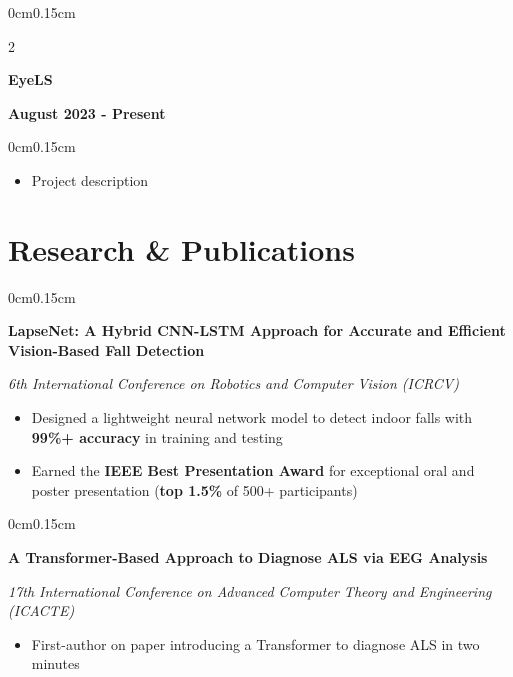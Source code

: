 \documentclass[10pt, letterpaper]{article}
\newenvironment{highlights}{
    \begin{itemize}[topsep=0pt, parsep=0pt, partopsep=0pt, itemsep=0pt, leftmargin=0.6cm]
}{
    \end{itemize}
}
\newenvironment{onecolentry}{
    \begin{adjustwidth}{0cm}{0.15cm}
}{
    \end{adjustwidth}
}
\newenvironment{twocolentry}[2][]{
    \onecolentry
    \def\secondColumn{#2}
    \setcolumnwidth{\fill, 4cm}
    \begin{paracol}{2}
}{
    \switchcolumn \raggedleft \secondColumn
    \end{paracol}
    \endonecolentry
}
\begin{document}
    \vspace{0.05cm}

    \begin{twocolentry}{\textbf{August 2023 - Present}}
        \textbf{EyeLS}
    \end{twocolentry}
    \vspace{-0.15cm}
    \begin{onecolentry}
        \begin{highlights}
            \item Project description
        \end{highlights}
    \end{onecolentry}

    \vspace{0.05cm}

    \section{Research \& Publications}
    \vspace{0.1cm}

    \begin{onecolentry}
        \textbf{LapseNet: A Hybrid CNN-LSTM Approach for Accurate and Efficient Vision-Based Fall Detection}
        
        \textit{6th International Conference on Robotics and Computer Vision (ICRCV)}
        \begin{highlights}
            \item Designed a lightweight neural network model to detect indoor falls with \textbf{99\%+ accuracy} in training and testing
            \item Earned the \textbf{IEEE Best Presentation Award} for exceptional oral and poster presentation (\textbf{top 1.5\%} of 500+ participants)
        \end{highlights}
    \end{onecolentry}

    \vspace{0.05cm}

    \begin{onecolentry}
        \textbf{A Transformer-Based Approach to Diagnose ALS via EEG Analysis}
        
        \textit{17th International Conference on Advanced Computer Theory and Engineering (ICACTE)}
        \begin{highlights}
            \item First-author on paper introducing a Transformer to diagnose ALS in two minutes
        \end{highlights}
    \end{onecolentry}
\end{document}
